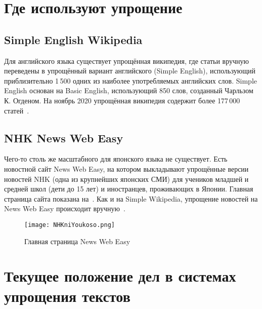 \section{Где используют упрощение}




\subsection{Simple English Wikipedia}


Для английского языка существует упрощённая википедия, где статьи вручную переведены в упрощённый вариант английского (Simple English), использующий приблизительно 1\,500 одних из наиболее употребляемых английских слов.
Simple English основан на Basic English, использующий 850 слов, созданный Чарльзом К. Огденом.
На ноябрь 2020 упрощённая википедия содержит более 177\,000 статей~\cite{SimpleWiki}.


\subsection{NHK News Web Easy}


Чего-то столь же масштабного для японского языка не существует.
Есть новостной сайт News Web Easy, на котором выкладывают упрощённые версии новостей NHK (одна из крупнейших японских СМИ) для учеников младшей и средней школ (дети до 15 лет) и иностранцев, проживающих в Японии.
Главная страница сайта показана на~.
Как и на Simple Wikipedia, упрощение новостей на News Web Easy происходит вручную~\cite{NHKnews}.
\begin{figure}[H]%
  \centering
  \texttt{[image: NHKniYoukoso.png]}
  \caption{Главная страница News Web Easy}
  \label{NHK}
\end{figure}


\section{Текущее положение дел в системах упрощения текстов}


